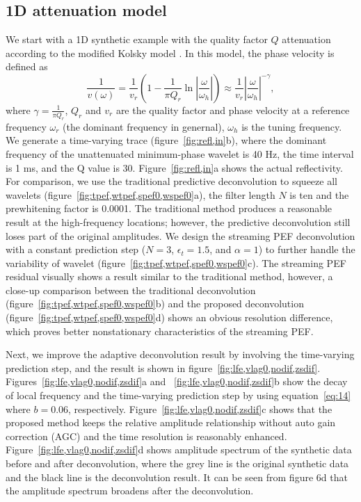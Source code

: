 \subsection{1D attenuation model}
We start with a 1D synthetic example with the quality factor $Q$
attenuation according to the modified Kolsky model
\cite[]{Wang04,Wang08}. In this model, the phase velocity is defined
as
\begin{equation}
  \label{eq:16}
  \frac{1}{v(\omega)}=\frac{1}{v_r}(1-\frac{1}{\pi Q_r}\ln{\left\vert
  \frac{\omega}{\omega_h} \right\vert})\approx\frac{1}{v_r}
  {\left\vert \frac{\omega}{\omega_h} \right\vert}^{-\gamma},
\end{equation}
where $\gamma=\frac{1}{\pi Q_r}$, $Q_r$ and $v_r$ are the quality factor and
phase velocity at a reference frequency $\omega_r$ (the dominant frequency
in genernal), $\omega_h$ is the tuning frequency. We generate a time-varying
trace (figure~\ref{fig:refl,in}b), where the dominant frequency of the
unattenuated minimum-phase wavelet is 40 Hz, the time interval is 1 ms, and
the Q value is 30. Figure~\ref{fig:refl,in}a shows the actual reflectivity.
For comparison, we use the traditional predictive deconvolution to squeeze
all wavelets (figure~\ref{fig:tpef,wtpef,spef0,wspef0}a), the filter length
$N$ is ten and the prewhitening factor is 0.0001. The traditional method
produces a reasonable result at the high-frequency locations; however, the
predictive deconvolution still loses part of the original amplitudes. We
design the streaming PEF deconvolution with a constant prediction step
($N=3$, $\epsilon_t=1.5$, and $\alpha=1$) to further handle the variability
of wavelet (figure~\ref{fig:tpef,wtpef,spef0,wspef0}c). The streaming PEF
residual visually shows a result similar to the traditional method, however,
a close-up comparison between the traditional deconvolution
(figure~\ref{fig:tpef,wtpef,spef0,wspef0}b) and the proposed deconvolution
(figure~\ref{fig:tpef,wtpef,spef0,wspef0}d) shows an obvious resolution
difference, which proves better nonstationary characteristics of the
streaming PEF.

Next, we improve the adaptive deconvolution result by involving the
time-varying prediction step, and the result is shown in
figure~\ref{fig:lfe,vlag0,nodif,zsdif}.
Figures~\ref{fig:lfe,vlag0,nodif,zsdif}a and
~\ref{fig:lfe,vlag0,nodif,zsdif}b show the decay of local frequency
and the time-varying prediction step by using equation~\ref{eq:14}
where $b=0.06$, respectively. Figure~\ref{fig:lfe,vlag0,nodif,zsdif}c
shows that the proposed method keeps the relative amplitude
relationship without auto gain correction (AGC) and the time
resolution is reasonably enhanced.
Figure~\ref{fig:lfe,vlag0,nodif,zsdif}d shows amplitude spectrum of
the synthetic data before and after deconvolution, where the grey line
is the original synthetic data and the black line is the deconvolution
result. It can be seen from figure 6d that the amplitude spectrum
broadens after the deconvolution.

